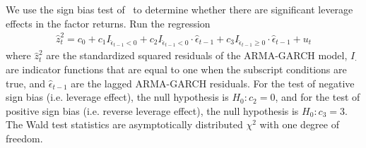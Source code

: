 We use the sign bias test of~\textcite{EngleNg1993} to determine whether there are significant leverage effects in the factor returns. Run the regression
\begin{align}
  \hat{z}_t^2 = c_0 + c_1 I_{\hat{\epsilon}_{t-1} < 0} + c_2 I_{\hat{\epsilon}_{t-1} < 0} \cdot \hat{\epsilon}_{t-1} + c_3 I_{\hat{\epsilon}_{t-1} \geq 0} \cdot \hat{\epsilon}_{t-1} + u_t
\end{align}
where $\hat{z}_t^2$ are the standardized squared residuals of the ARMA-GARCH model, $I_\cdot$ are indicator functions that are equal to one when the subscript conditions are true, and $\hat{\epsilon}_{t-1}$ are the lagged ARMA-GARCH residuals. For the test of negative sign bias (i.e. leverage effect), the null hypothesis is $H_0: c_2 = 0$, and for the test of positive sign bias (i.e. reverse leverage effect), the null hypothesis is $H_0: c_3 = 3$. The Wald test statistics are asymptotically distributed $\chi^2$ with one degree of freedom.



